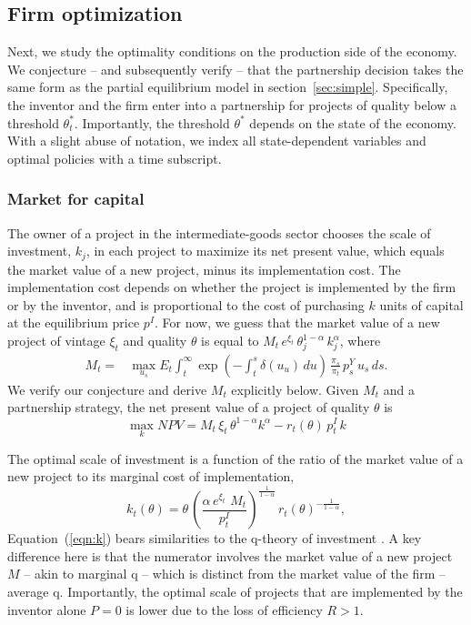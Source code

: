 \documentclass[12pt]{article}
\begin{document}
\subsection{Firm optimization}


Next, we study the optimality conditions on the production side of the economy. We conjecture -- and subsequently verify -- that the partnership decision takes the same form as the partial equilibrium model in section~\ref{sec:simple}. Specifically, the inventor and the firm enter into a partnership for projects of quality below a threshold $\theta^*_t$. Importantly, the threshold $\theta^*$   depends on the state of the economy. With a slight abuse of notation, we index all state-dependent variables and optimal policies with a time subscript.

\subsubsection{Market for capital}
The owner of a project in the intermediate-goods sector  chooses the scale  of investment, $k_j$, in each project to maximize its net present value, which equals the market value of a new project, minus its implementation cost. The implementation cost depends on whether the project is implemented by the firm or by the inventor, and is proportional to the cost of purchasing $k$ units of capital at the equilibrium price $p^I$.  For now, we guess that the market value of a new project of vintage $\xi_t$ and quality $\theta$ is equal to $M_t \,e^{\xi_t}\, \theta_j^{1-\alpha}\, k_j^\alpha $, where
\begin{align}\label{eqn:M}
M_t  =& \max_{u_s} E_t \int_t^\infty \exp\left({-\int_t^s  \delta(u_u) \,du }\right)\, \frac{\pi_s}{\pi_t}  \, p^Y_{s}   \, u_s\,  ds.
\end{align}
We verify our conjecture and derive $M_t$ explicitly below. Given $M_t$ and a partnership strategy, the net present value of a project of quality $\theta$ is
\begin{equation}\label{eqn:npv}
\max_k NPV =M_t\,{\xi_t}\, \theta^{1-\alpha} k^\alpha - r_t(\theta) \, p^I_t\, k
\end{equation}

The optimal scale of investment is a function of the ratio of the market value of a new project to its marginal cost of implementation,
\begin{equation}\label{eqn:k}
k_t(\theta)=
\theta\,\left(\frac{\alpha \,e^{\xi_t}\,\,M_t}{p^I_t}\right)^{\frac{1}{1-\alpha}} \,r_t(\theta)^{-\frac{1}{1-\alpha}},
\end{equation}
Equation~(\ref{eqn:k}) bears similarities to the q-theory of investment \citep{Hayashi1982a}. A key difference here is that the numerator involves the market value of a new project $M$ -- akin to marginal q -- which is distinct from the market value of the firm -- average q. Importantly, the optimal scale of projects that are implemented by the inventor alone $P=0$ is lower due to the loss of efficiency $R>1$.
\end{document}
